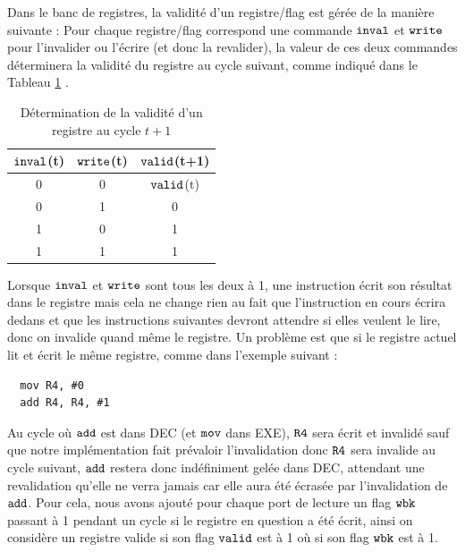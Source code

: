\documentclass{article}
\begin{document}
Dans le banc de registres, la validité d'un registre/flag est gérée de la manière suivante :
Pour chaque registre/flag correspond une commande $\tt{inval}$ et $\tt{write}$
pour l'invalider ou l'écrire
(et donc la revalider), la valeur de ces deux commandes déterminera la validité du registre
au cycle suivant, comme indiqué dans le Tableau \ref{valid} .

\begin{table}[H]
\centering
\begingroup
\setlength{\tabcolsep}{5pt}
\renewcommand{\arraystretch}{1.1}
\begin{tabular}{ | c | c | c | }
\hline
$\tt{inval}$(t) & $\tt{write}$(t)  & $\tt{valid}$(t+1) \\
\hline
0  & 0  & $\tt{valid}$(t) \\
0  & 1  & 0        \\
1  & 0  & 1        \\
1  & 1  & 1        \\
\hline
\end{tabular}
\endgroup
\caption{Détermination de la validité d'un registre au cycle $t+1$}
\label{valid}
\end{table}


Lorsque $\tt{inval}$ et $\tt{write}$ sont tous les deux à 1,
une instruction écrit son résultat
dans le registre mais cela ne change rien au fait que l'instruction en cours écrira dedans
et que les instructions suivantes devront attendre si elles veulent le lire, donc on
invalide quand même le registre.
Un problème est que si le registre actuel lit et écrit le même registre, comme
dans l'exemple suivant :

\begin{lstlisting}
  mov R4, #0
  add R4, R4, #1
\end{lstlisting}

Au cycle où $\tt{add}$ est dans DEC (et $\tt{mov}$ dans EXE),
$\tt{R4}$ sera écrit et invalidé sauf que notre
implémentation fait prévaloir l'invalidation donc $\tt{R4}$ sera invalide au cycle suivant,
$\tt{add}$ restera donc indéfiniment gelée dans DEC,
attendant une revalidation qu'elle ne verra jamais car elle aura été écrasée par l'invalidation de
$\tt{add}$.
Pour cela, nous avons ajouté pour chaque port de lecture un flag $\tt{wbk}$ passant à 1 pendant un cycle
si le registre en question a été écrit, ainsi on considère un registre valide si son flag $\tt{valid}$
est à 1 où si son flag $\tt{wbk}$ est à 1.
 

\end{document}
